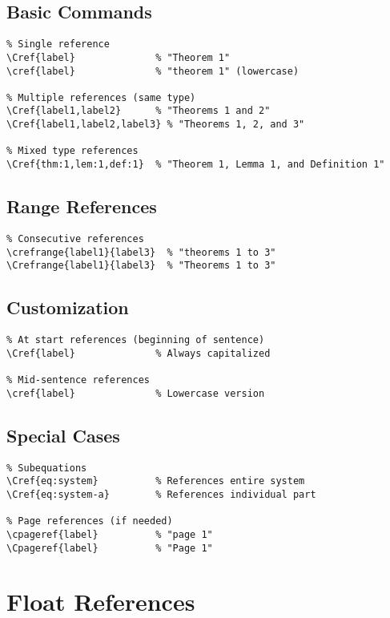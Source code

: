 \documentclass[11pt]{article}
\begin{document}
\subsection{Basic Commands}

\begin{verbatim}
% Single reference
\Cref{label}              % "Theorem 1"
\cref{label}              % "theorem 1" (lowercase)

% Multiple references (same type)
\Cref{label1,label2}      % "Theorems 1 and 2"
\Cref{label1,label2,label3} % "Theorems 1, 2, and 3"

% Mixed type references
\Cref{thm:1,lem:1,def:1}  % "Theorem 1, Lemma 1, and Definition 1"
\end{verbatim}

\subsection{Range References}

\begin{verbatim}
% Consecutive references
\crefrange{label1}{label3}  % "theorems 1 to 3"
\Crefrange{label1}{label3}  % "Theorems 1 to 3"
\end{verbatim}

\subsection{Customization}

\begin{verbatim}
% At start references (beginning of sentence)
\Cref{label}              % Always capitalized

% Mid-sentence references  
\cref{label}              % Lowercase version
\end{verbatim}

\subsection{Special Cases}

\begin{verbatim}
% Subequations
\Cref{eq:system}          % References entire system
\Cref{eq:system-a}        % References individual part

% Page references (if needed)
\cpageref{label}          % "page 1"
\Cpageref{label}          % "Page 1"
\end{verbatim}

\section{Float References}
\end{document}
